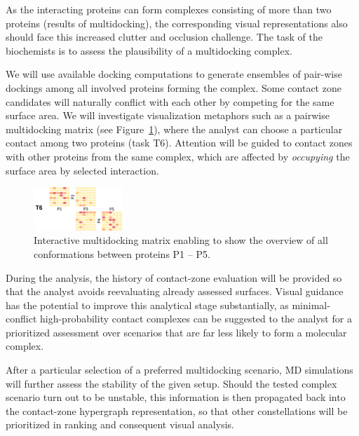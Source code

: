 \documentclass[11pt,a4paper,titlepage,oneside,onecolumn]{article}
\begin{document}
As the interacting proteins can form complexes consisting of more than two proteins (results of multidocking), the corresponding visual representations also should face this increased clutter and occlusion challenge.
The task of the biochemists is to assess the plausibility of a multidocking complex.%


We will use available docking computations to generate ensembles of pair-wise dockings among all involved proteins forming the complex. 
Some contact zone candidates will naturally conflict with each other by competing for the same surface area. 
We will investigate visualization metaphors such as a pairwise multidocking matrix (see Figure~\ref{fig:multidock2}), where the analyst can choose a particular contact among two proteins (task T6). 
Attention will be guided to contact zones with other proteins from the same complex, which are affected by \emph{occupying} the surface area by selected interaction. 

\begin{figure}[bh]
\centering
\includegraphics[width=0.3\textwidth]{pics/multidock2.png}
\caption{Interactive multidocking matrix enabling to show the overview of all conformations between proteins P1 -- P5.}
\label{fig:multidock2}
\end{figure}

During the analysis, the history of contact-zone evaluation will be provided so that the analyst avoids reevaluating already assessed surfaces. 
Visual guidance has the potential to improve this analytical stage substantially, as minimal-conflict high-probability contact complexes can be suggested to the analyst for a prioritized assessment over scenarios that are far less likely to form a molecular complex.

After a particular selection of a preferred multidocking scenario, MD simulations will further assess the stability of the given setup. 
Should the tested complex scenario turn out to be unstable, this information is then propagated back into the contact-zone hypergraph representation, so that other constellations will be prioritized in ranking and consequent visual analysis.
\end{document}
